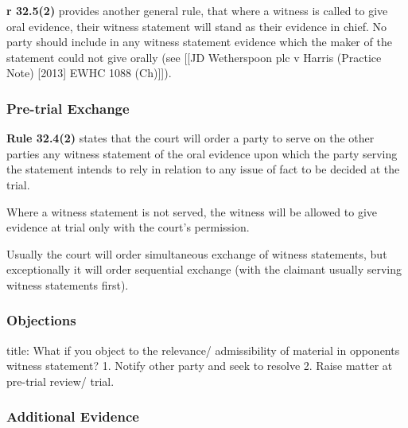 \documentclass[
]{article}
\newenvironment{Shaded}{}{}
\newcommand{\NormalTok}[1]{#1}
\begin{document}
\textbf{r 32.5(2)} provides another general rule, that where a witness
is called to give oral evidence, their witness statement will stand as
their evidence in chief. No party should include in any witness
statement evidence which the maker of the statement could not give
orally (see {[}{[}JD Wetherspoon plc v Harris (Practice Note) {[}2013{]}
EWHC 1088 (Ch){]}{]}).

\hypertarget{pre-trial-exchange}{%
\subsubsection{Pre-trial Exchange}\label{pre-trial-exchange}}

\textbf{Rule 32.4(2)} states that the court will order a party to serve
on the other parties any witness statement of the oral evidence upon
which the party serving the statement intends to rely in relation to any
issue of fact to be decided at the trial.

\begin{Shaded}
\begin{Highlighting}[]
\NormalTok{Where a witness statement is not served, the witness will be allowed to give evidence at trial only with the court’s permission.}
\end{Highlighting}
\end{Shaded}

Usually the court will order simultaneous exchange of witness
statements, but exceptionally it will order sequential exchange (with
the claimant usually serving witness statements first).

\hypertarget{objections}{%
\subsubsection{Objections}\label{objections}}

\begin{Shaded}
\begin{Highlighting}[]
\NormalTok{title: What if you object to the relevance/ admissibility of material in opponent\textquotesingle{}s witness statement?}
\NormalTok{1. Notify other party and seek to resolve}
\NormalTok{2. Raise matter at pre{-}trial review/ trial. }
\end{Highlighting}
\end{Shaded}

\hypertarget{additional-evidence}{%
\subsubsection{Additional Evidence}\label{additional-evidence}}
\end{document}
